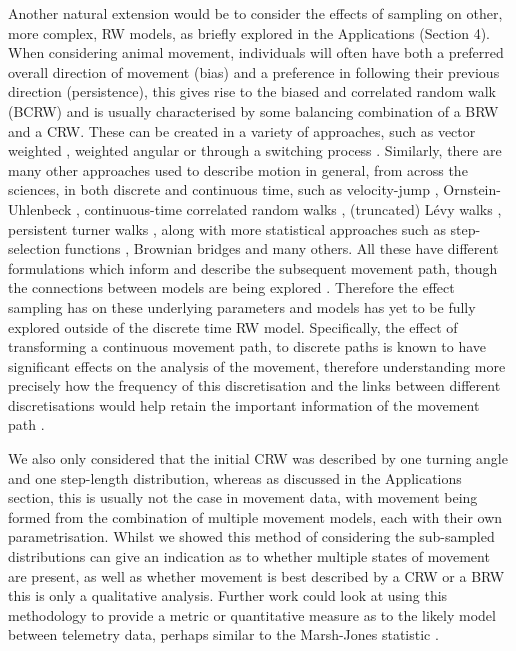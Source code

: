 \documentclass[english]{article}
\begin{document}
Another natural extension would be to consider the effects of sampling on other, more complex, RW models, as briefly explored in the Applications (Section 4). When considering animal movement, individuals will often have both a preferred overall direction of movement (bias) and a preference in following their previous direction (persistence), this gives rise to the biased and correlated random walk (BCRW) and is usually characterised by some balancing combination of a BRW and a CRW.  These can be created in a variety of approaches, such as vector weighted \citep{benhamou1992efficiency,bailey2018navigational}, weighted angular \citep{schultz2001edge} or through a switching process \citep{peleg2016optimal}.  Similarly, there are many other approaches used to describe motion in general, from across the sciences, in both discrete and continuous time, such as velocity-jump \citep{monmarche2020velocity,othmer2000diffusion}, Ornstein-Uhlenbeck \citep{sevilla2019generalized,breed2017predicting}, continuous-time correlated random walks \citep{johnson2008continuous}, (truncated) L\'{e}vy walks \citep{humphries2013new,zaburdaev2015levy}, persistent turner walks \citep{gautrais2009analyzing}, along with more statistical approaches such as step-selection functions \citep{thurfjell2014applications,duchesne2015equivalence}, Brownian bridges \citep{horne2007analyzing} and many others.  All these have different formulations which inform and describe the subsequent movement path, though the connections between models are being explored \cite{duchesne2015equivalence}.  Therefore the effect sampling has on these underlying parameters and models has yet to be fully explored outside of the discrete time RW model.  Specifically, the effect of transforming a continuous movement path, to discrete paths is known to have significant effects on the analysis of the movement, therefore understanding more precisely how the frequency of this discretisation and the links between different discretisations would help retain the important information of the movement path \citep{mcclintock2014discrete}. 

We also only considered that the initial CRW was described by one turning angle and one step-length distribution, whereas as discussed in the Applications section, this is usually not the case in movement data, with movement being formed from the combination of multiple movement models, each with their own parametrisation.  
Whilst we showed this method of considering the sub-sampled distributions can give an indication as to whether multiple states of movement are present, as well as whether movement is best described by a CRW or a BRW this is only a qualitative analysis.  Further work could look at using this methodology to provide a metric or quantitative measure as to the likely model between telemetry data, perhaps similar to the Marsh-Jones statistic \citep{marsh1988form}.
\end{document}
